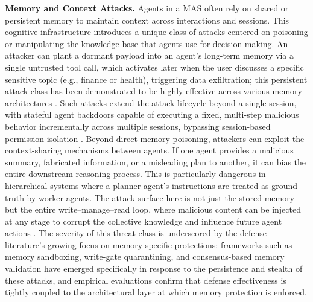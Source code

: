 \documentclass[11pt]{article}
\begin{document}
\textbf{Memory and Context Attacks.} Agents in a MAS often rely on shared or persistent memory to maintain context across interactions and sessions. This cognitive infrastructure introduces a unique class of attacks centered on poisoning or manipulating the knowledge base that agents use for decision-making. An attacker can plant a dormant payload into an agent's long-term memory via a single untrusted tool call, which activates later when the user discusses a specific sensitive topic (e.g., finance or health), triggering data exfiltration; this persistent attack class has been demonstrated to be highly effective across various memory architectures \cite{ref413}. Such attacks extend the attack lifecycle beyond a single session, with stateful agent backdoors capable of executing a fixed, multi-step malicious behavior incrementally across multiple sessions, bypassing session-based permission isolation \cite{ref414}. Beyond direct memory poisoning, attackers can exploit the context-sharing mechanisms between agents. If one agent provides a malicious summary, fabricated information, or a misleading plan to another, it can bias the entire downstream reasoning process. This is particularly dangerous in hierarchical systems where a planner agent's instructions are treated as ground truth by worker agents. The attack surface here is not just the stored memory but the entire write--manage--read loop, where malicious content can be injected at any stage to corrupt the collective knowledge and influence future agent actions \cite{ref415}. The severity of this threat class is underscored by the defense literature's growing focus on memory-specific protections: frameworks such as memory sandboxing, write-gate quarantining, and consensus-based memory validation have emerged specifically in response to the persistence and stealth of these attacks, and empirical evaluations confirm that defense effectiveness is tightly coupled to the architectural layer at which memory protection is enforced.
\end{document}

